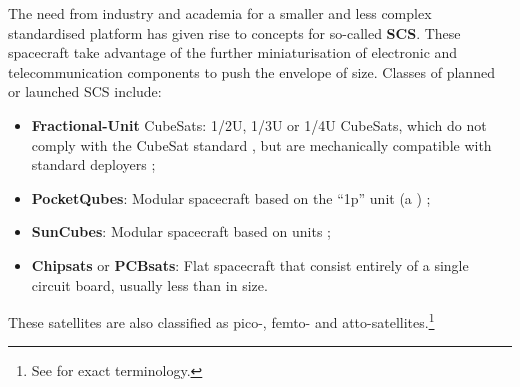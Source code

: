 \documentclass[a4paper,nobib,justified,final]{tufte-book}
\begin{document}
The need from industry and academia for a smaller and less complex standardised platform has given rise to concepts for so-called \textbf{\acf{SCS}}. These spacecraft take advantage of the further miniaturisation of electronic and telecommunication components to push the envelope of size. Classes of planned or launched \acs{SCS} include:

\begin{itemize}[itemsep=-1ex]
	\item \textbf{Fractional-Unit} CubeSats: 1/2U, 1/3U or 1/4U CubeSats, which do not comply with the CubeSat standard \cite{CDS14}, but are mechanically compatible with standard deployers \autocite{kuluNanosatsDatabase2023,krebsThinSat1A1L2021};
	\item \textbf{PocketQubes}: Modular spacecraft based on the ``1p'' unit (a ) \autocite{PQ1};
	\item \textbf{SunCubes}: Modular spacecraft based on  units \autocite{martinezSunCubeFemtoSatDesign2018};
	\item \textbf{Chipsats} or \textbf{\acs{PCB}sats}: Flat spacecraft that consist entirely of a single circuit board, usually less than  in size.
\end{itemize}

These satellites are also classified as pico-, femto- and atto-satellites.\footnote{See  for exact terminology.}
\end{document}
